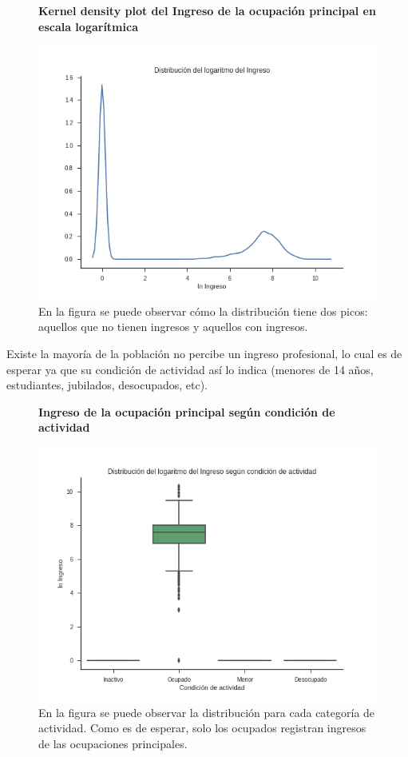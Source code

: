 \begin{figure}[!htb]
	\centering
	\textbf{Kernel density plot del Ingreso de la ocupación principal en escala logarítmica}\par\medskip
	\includegraphics[scale = 0.5]{../img/capitulo3/kdePlotIngreso1.png}
	\caption{En la figura se puede observar cómo la distribución tiene dos picos: aquellos que no tienen ingresos y aquellos con ingresos.}
\end{figure}

Existe la mayoría de la población no percibe un ingreso profesional, lo cual es de esperar ya que su condición de actividad así lo indica (menores de 14 años, estudiantes, jubilados, desocupados, etc). 

\begin{figure}[!htb]
	\centering
	\textbf{Ingreso de la ocupación principal según condición de actividad}\par\medskip
	\includegraphics[scale = 0.5]{../img/capitulo3/kdePlotIngreso2.png}
	\caption{En la figura se puede observar la distribución para cada categoría de actividad. Como es de esperar, solo los ocupados registran ingresos de las ocupaciones principales.}
\end{figure}

